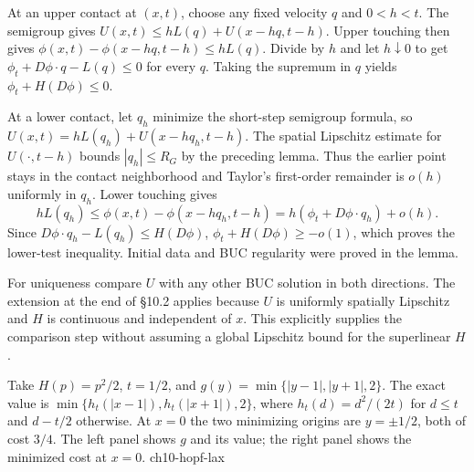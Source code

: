 \begin{expandedproof}
At an upper contact at $(x,t)$, choose any fixed velocity $q$ and
$0<h<t$. The semigroup gives
$U(x,t)\leq hL(q)+U(x-hq,t-h)$.
Upper touching then gives
$\phi(x,t)-\phi(x-hq,t-h)\leq hL(q)$.
Divide by $h$ and let $h\downarrow0$ to get
$\phi_t+D\phi\cdot q-L(q)\leq0$ for every $q$.
Taking the supremum in $q$ yields $\phi_t+H(D\phi)\leq0$.

At a lower contact, let $q_h$ minimize the short-step semigroup formula,
so $U(x,t)=hL(q_h)+U(x-hq_h,t-h)$. The spatial Lipschitz estimate
for $U(\cdot,t-h)$ bounds $|q_h|\leq R_G$ by the preceding lemma.
Thus the earlier point stays in the contact neighborhood and Taylor's
first-order remainder is $o(h)$ uniformly in $q_h$. Lower touching gives
\[
 hL(q_h)\leq\phi(x,t)-\phi(x-hq_h,t-h)
 =h(\phi_t+D\phi\cdot q_h)+o(h).
\]
Since $D\phi\cdot q_h-L(q_h)\leq H(D\phi)$,
$\phi_t+H(D\phi)\geq-o(1)$, which proves the lower-test inequality.
Initial data and BUC regularity were proved in the lemma.

For uniqueness compare $U$ with any other BUC solution in both directions.
The extension at the end of \S10.2 applies because $U$ is uniformly
spatially Lipschitz and $H$ is continuous and independent of $x$.
This explicitly supplies the comparison step without assuming a global
Lipschitz bound for the superlinear $H$.
\end{expandedproof}
{Take $H(p)=p^2/2$, $t=1/2$, and $g(y)=\min\{|y-1|,|y+1|,2\}$. The exact value is $\min\{h_t(|x-1|),h_t(|x+1|),2\}$, where $h_t(d)=d^2/(2t)$ for $d\leq t$ and $d-t/2$ otherwise. At $x=0$ the two minimizing origins are $y=\pm1/2$, both of cost $3/4$. The left panel shows $g$ and its value; the right panel shows the minimized cost at $x=0$.}
{ch10-hopf-lax}
\Needspace{42mm}
